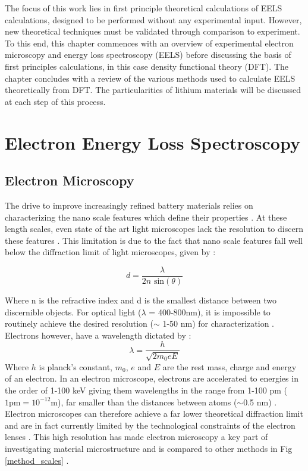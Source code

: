 


The focus of this work lies in  first principle theoretical calculations of EELS calculations, designed to be performed without any experimental input.  However, new theoretical techniques must be validated through comparison to experiment.  To this end, this chapter commences with an overview of experimental electron microscopy and  energy loss spectroscopy (EELS) before discussing the basis of first principles calculations, in this case density functional theory (DFT). The chapter concludes with a review of the various methods used to calculate EELS theoretically from DFT.  The particularities of lithium materials will be discussed at each step of this process.  
 
\section{Electron Energy Loss Spectroscopy}

\subsection{Electron Microscopy}
The drive to improve increasingly refined battery materials relies on characterizing   the nano scale features which define their properties \cite{goldstein_electron_2003}.  At these length scales, even state of the art light microscopes lack the resolution to discern these features \cite{rust_sub-diffraction-limit_2006}.  This limitation is due to the fact that nano scale features fall well below the diffraction limit of light microscopes, given by \cite{hecht}: 

\begin{equation}
	d = \frac{\lambda}{2n\textrm{ sin}(\theta)}
\end{equation}

Where n is the refractive index and d is the smallest distance between two discernible objects. For optical light ($\lambda$ = 400-800nm), it is impossible to routinely achieve the desired resolution ($\sim$ 1-50 nm) for characterization \cite{rust_sub-diffraction-limit_2006}.  Electrons however, have a wavelength dictated by \cite{goldstein_electron_2003}: 
\begin{equation}
 \lambda = \frac{h}{\sqrt{2 m_0 e E}}
\end{equation}
Where $h$ is planck's constant, $m_0$, $e$ and $E$ are the rest mass, charge and energy of an electron.  In an electron microscope, electrons are accelerated to energies in the order of 1-100 keV giving them wavelengths in the range from 1-100 pm ($1\mathrm{pm}=10^{-12}$m), far  smaller than the distances between atoms ($\sim$0.5 nm) \cite{morales_laser_1998}.  Electron microscopes can therefore achieve a far lower theoretical diffraction limit  and are in fact currently limited by the technological constraints of the electron  lenses \cite{goldstein_electron_2003}.  This high resolution has made electron microscopy a key part of investigating material microstructure and is compared to other methods  in Fig \ref{method_scales} \cite{inkson_2_2016}. 


